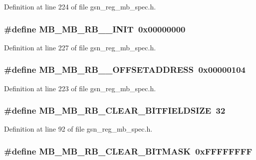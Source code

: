 Definition at line 224 of file gsn\_\-reg\_\-mb\_\-spec.h.

\hypertarget{a00562_a888bdffa0bf31e92ec50e0bfb8da85bb}{
\subsubsection[{MB\_\-MB\_\-RB\_\-1\_\-INIT}]{\setlength{\rightskip}{0pt plus 5cm}\#define MB\_\-MB\_\-RB\_\_\-INIT~0x00000000}}
\label{a00562_a888bdffa0bf31e92ec50e0bfb8da85bb}


Definition at line 227 of file gsn\_\-reg\_\-mb\_\-spec.h.

\hypertarget{a00562_add91429f73c1e41ff4164809ce5e60f7}{
\subsubsection[{MB\_\-MB\_\-RB\_\-1\_\-OFFSETADDRESS}]{\setlength{\rightskip}{0pt plus 5cm}\#define MB\_\-MB\_\-RB\_\_\-OFFSETADDRESS~0x00000104}}
\label{a00562_add91429f73c1e41ff4164809ce5e60f7}


Definition at line 223 of file gsn\_\-reg\_\-mb\_\-spec.h.

\hypertarget{a00562_aa802d89f024427994066231091cb66c8}{
\subsubsection[{MB\_\-MB\_\-RB\_\-CLEAR\_\-BITFIELDSIZE}]{\setlength{\rightskip}{0pt plus 5cm}\#define MB\_\-MB\_\-RB\_\-CLEAR\_\-BITFIELDSIZE~32}}
\label{a00562_aa802d89f024427994066231091cb66c8}


Definition at line 92 of file gsn\_\-reg\_\-mb\_\-spec.h.

\hypertarget{a00562_aa4a5385412175d539d7f8ce01ee0eeff}{
\subsubsection[{MB\_\-MB\_\-RB\_\-CLEAR\_\-BITMASK}]{\setlength{\rightskip}{0pt plus 5cm}\#define MB\_\-MB\_\-RB\_\-CLEAR\_\-BITMASK~0xFFFFFFFF}}
\label{a00562_aa4a5385412175d539d7f8ce01ee0eeff}


